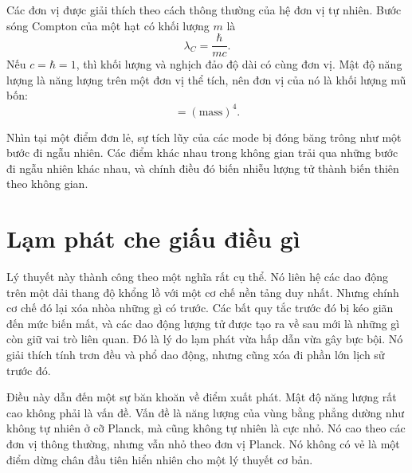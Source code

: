 Các đơn vị được giải thích theo cách thông thường của hệ đơn vị tự nhiên. Bước sóng Compton của một hạt có khối lượng \(m\) là
\begin{equation}
\lambda_C=\frac{\hbar}{mc}.
\end{equation}
Nếu \(c=\hbar=1\), thì khối lượng và nghịch đảo độ dài có cùng đơn vị. Mật độ năng lượng là năng lượng trên một đơn vị thể tích, nên đơn vị của nó là khối lượng mũ bốn:
\begin{equation}
[\rho]=(\mathrm{mass})^4.
\end{equation}

Nhìn tại một điểm đơn lẻ, sự tích lũy của các mode bị đóng băng trông như một bước đi ngẫu nhiên. Các điểm khác nhau trong không gian trải qua những bước đi ngẫu nhiên khác nhau, và chính điều đó biến nhiễu lượng tử thành biến thiên theo không gian.

\begin{classroomqa}
\end{classroomqa}

\section{Lạm phát che giấu điều gì}

Lý thuyết này thành công theo một nghĩa rất cụ thể. Nó liên hệ các dao động trên một dải thang độ khổng lồ với một cơ chế nền tảng duy nhất. Nhưng chính cơ chế đó lại xóa nhòa những gì có trước. Các bất quy tắc trước đó bị kéo giãn đến mức biến mất, và các dao động lượng tử được tạo ra về sau mới là những gì còn giữ vai trò liên quan. Đó là lý do lạm phát vừa hấp dẫn vừa gây bực bội. Nó giải thích tính trơn đều và phổ dao động, nhưng cũng xóa đi phần lớn lịch sử trước đó.

Điều này dẫn đến một sự băn khoăn về điểm xuất phát. Mật độ năng lượng rất cao không phải là vấn đề. Vấn đề là năng lượng của vùng bằng phẳng dường như không tự nhiên ở cỡ Planck, mà cũng không tự nhiên là cực nhỏ. Nó cao theo các đơn vị thông thường, nhưng vẫn nhỏ theo đơn vị Planck. Nó không có vẻ là một điểm dừng chân đầu tiên hiển nhiên cho một lý thuyết cơ bản.

